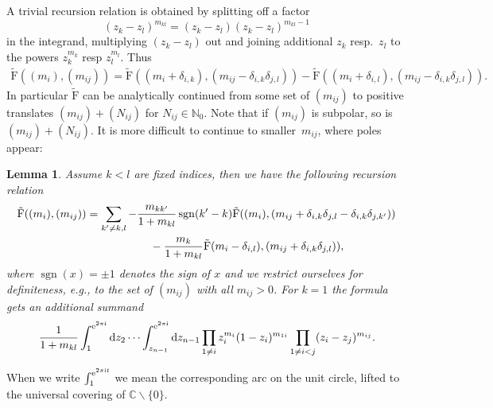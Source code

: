 \documentclass[10pt,a4paper]{amsart}
\numberwithin{equation}{section}
\newtheorem{lem}[teo]{Lemma}
\newcommand{\N}{\mathbb{N}}
\newcommand{\C}{\mathbb{C}}
\renewcommand{\i}{\mathrm{i}}
\renewcommand{\d}{\mathrm{d}}
\newcommand{\rFp}{\tilde{\mathrm{F}}}
\begin{document}
A trivial recursion relation is obtained by splitting off a factor
\[
(z_k-z_l)^{m_{kl}}=(z_k-z_l)(z_k-z_l)^{m_{kl}-1}
\] in the integrand, multiplying $(z_k-z_l)$ out and joining additional $z_k$ resp.~$z_l$ to the powers $z_k^{m_k}$ resp $z_l^{m_l}$. Thus
\begin{gather*}
	\rFp((m_i),(m_{ij}))
	=\rFp((m_i+\delta_{i,k}),(m_{ij}-\delta_{i,k}\delta_{j,l}))
	-\rFp((m_i+\delta_{i,l}),(m_{ij}-\delta_{i,k}\delta_{j,l})).
\end{gather*}
In particular $\rFp$ can be analytically continued from some set of $(m_{ij})$ to positive translates $(m_{ij})+(N_{ij})$ for $N_{ij}\in\N_0$. Note that if $(m_{ij})$ is subpolar, so is $(m_{ij})+(N_{ij})$. It is more difficult to continue to smaller~$m_{ij}$, where poles appear:

\begin{lem}\label{lm_recursion}Assume $k<l$ are fixed indices, then we have the following
recursion relation
\begin{gather*}\rFp((m_i),(m_{ij})) =\sum_{k'\neq k,l} -\frac{m_{kk'}}{1+m_{kl}}\operatorname{sgn}(k'-k) \rFp((m_i),(m_{ij}+\delta_{i,k}\delta_{j,l}-\delta_{i,k}\delta_{j,k'}))\\
\hphantom{\rFp((m_i),(m_{ij})) =}{}
-\frac{m_{k}}{1+m_{kl}} \rFp(m_i-\delta_{i,l}),(m_{ij}+\delta_{i,k}\delta_{j,l})),
 \end{gather*}
where $\operatorname{sgn}(x)=\pm1$ denotes the sign of $x$ and we
restrict ourselves for definiteness, e.g., to the set of $(m_{ij})$ with
all $m_{ij}>0$. For $k=1$ the formula gets an additional summand
\[
\frac{1}{1+m_{kl}}\int_1^{{\rm e}^{2\pi\i }}\d z_2\cdots
\int_{z_{n-1}}^{{\rm e}^{2\pi\i }}\d z_{n-1} \prod_{1\neq i}
z_i^{m_i}(1-z_i)^{m_{1i}}\prod_{1\neq i<j}(z_i - z_j)^{m_{ij}}.
\]
\end{lem}

When we write $\int_{1}^{{\rm e}^{2\pi\i t}}$ we mean the
corresponding arc on the unit circle, lifted to the universal covering
of $\C\backslash\{0\}$.
\end{document}
